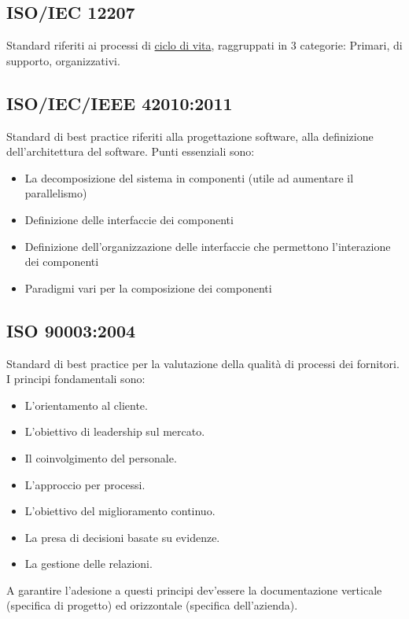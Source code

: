	\subsection{ISO/IEC 12207}
	\label{sec:iso12207}
	Standard riferiti ai processi di \hyperref[sec:ciclodivita]{ciclo di vita}, raggruppati in 3 categorie: Primari, di supporto, organizzativi.
	\linebreak

	\subsection{ISO/IEC/IEEE 42010:2011}
	\label{sec:iso12207}
	Standard di best practice riferiti alla progettazione software, alla definizione dell'architettura del software. Punti essenziali sono:
	\begin{itemize}  
	\item La decomposizione del sistema in componenti (utile ad aumentare il parallelismo)
	\item Definizione delle interfaccie dei componenti 
	\item Definizione dell'organizzazione delle interfaccie che permettono l'interazione dei componenti
	\item Paradigmi vari per la composizione dei componenti 
	\end{itemize}		

	\subsection{ISO 90003:2004}
	\label{sec:iso90003}
	Standard di best practice per la valutazione della qualità di processi dei fornitori. I principi fondamentali sono:
	\begin{itemize}  
	\item L'orientamento al cliente.
	\item L'obiettivo di leadership sul mercato.
	\item Il coinvolgimento del personale.
	\item L'approccio per processi.
	\item L'obiettivo del miglioramento continuo.
	\item La presa di decisioni basate su evidenze.
	\item La gestione delle relazioni.
	\end{itemize}	
	A garantire l'adesione a questi principi dev'essere la documentazione verticale (specifica di progetto) ed orizzontale (specifica dell'azienda).	
	
